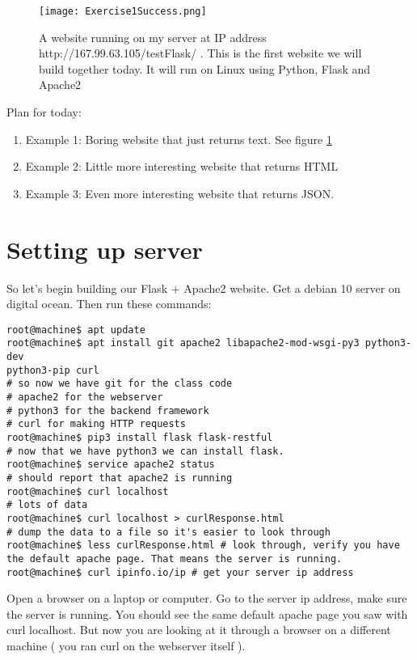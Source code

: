\documentclass[10pt]{article}
\begin{document}
\begin{figure}[h]
  \centering
    \texttt{[image: Exercise1Success.png]}
  \caption{A website running on my server at IP address
http://167.99.63.105/testFlask/ . This is the first website we will build
together today. It will run on Linux using Python, Flask and Apache2}
\label{fig:firstsite}
\end{figure}


Plan for today:
\begin{enumerate}
\item Example 1: Boring website that just returns text. See figure
\ref{fig:firstsite}
\item Example 2: Little more interesting website that returns HTML
\item Example 3: Even more interesting website that returns JSON.
\end{enumerate}

\section{Setting up server}
So let's begin building our Flask + Apache2 website. Get a debian 10 server on
digital ocean. Then run these commands:

\begin{lstlisting}[style=term, caption=configure your server, label=lst:install]
root@machine$ apt update
root@machine$ apt install git apache2 libapache2-mod-wsgi-py3 python3-dev
python3-pip curl
# so now we have git for the class code
# apache2 for the webserver
# python3 for the backend framework
# curl for making HTTP requests
root@machine$ pip3 install flask flask-restful
# now that we have python3 we can install flask.
root@machine$ service apache2 status
# should report that apache2 is running
root@machine$ curl localhost
# lots of data
root@machine$ curl localhost > curlResponse.html
# dump the data to a file so it's easier to look through
root@machine$ less curlResponse.html # look through, verify you have the default apache page. That means the server is running.
root@machine$ curl ipinfo.io/ip # get your server ip address
\end{lstlisting}

Open a browser on a laptop or computer. Go to the server ip address, make sure the server is running. You should see the same default apache page you saw with curl localhost. But now you are looking at it through a browser on a different machine ( you ran curl on the webserver itself ).
\end{document}
